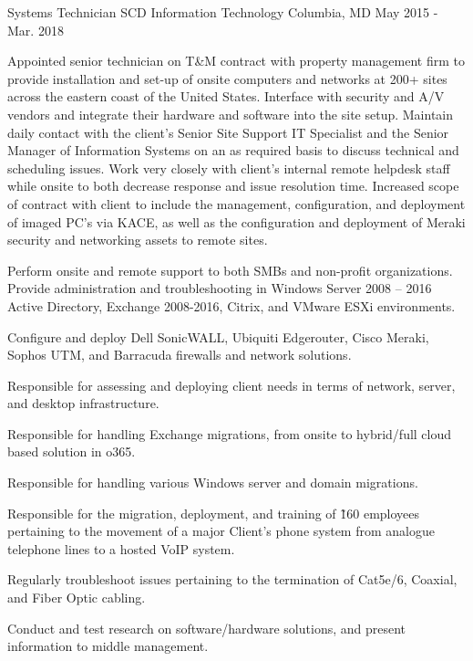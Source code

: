 \begin{cventries}
  \cventry
    {Systems Technician} %
    {SCD Information Technology} %
    {Columbia, MD} %
    {May 2015 - Mar. 2018} %
    {
      \begin{cvitems} %
        \item {Appointed senior technician on T\&M contract with property management firm to provide installation and set-up of onsite computers and networks at 200+ sites across the eastern coast of the United States. Interface with security and A/V vendors and integrate their hardware and software into the site setup. Maintain daily contact with the client’s Senior Site Support IT Specialist and the Senior Manager of Information Systems on an as required basis to discuss technical and scheduling issues. Work very closely with client’s internal remote helpdesk staff while onsite to both decrease response and issue resolution time. Increased scope of contract with client to include the management, configuration, and deployment of imaged PC’s via KACE, as well as the configuration and deployment of Meraki security and networking assets to remote sites.}
        \item {Perform onsite and remote support to both SMBs and non-profit organizations. Provide administration and troubleshooting in Windows Server 2008 – 2016 Active Directory, Exchange 2008-2016, Citrix, and VMware ESXi environments.}
        \item {Configure and deploy Dell SonicWALL, Ubiquiti Edgerouter, Cisco Meraki, Sophos UTM, and Barracuda firewalls and network solutions.}
        \item {Responsible for assessing and deploying client needs in terms of network, server, and desktop infrastructure.}
        \item {Responsible for handling Exchange migrations, from onsite to hybrid/full cloud based solution in o365.}
        \item {Responsible for handling various Windows server and domain migrations.}
        \item {Responsible for the migration, deployment, and training of \~160 employees pertaining to the movement of a major Client’s phone system from analogue telephone lines to a hosted VoIP system.}
        \item {Regularly troubleshoot issues pertaining to the termination of Cat5e/6, Coaxial, and Fiber Optic cabling.}
        \item {Conduct and test research on software/hardware solutions, and present information to middle management.}
      \end{cvitems}
    }


\end{cventries}
